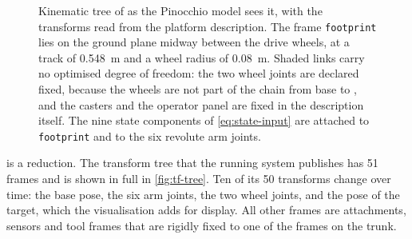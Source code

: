 \begin{figure}[htbp]
  \caption[Kinematic tree and frame convention of \hero{}]{%
    Kinematic tree of \hero{} as the Pinocchio model sees it, with the
    transforms read from the platform description. The frame
    \texttt{footprint} lies on the ground plane midway between the drive
    wheels, at a track of \qty{0.548}{\meter} and a wheel radius of
    \qty{0.08}{\meter}. Shaded links carry no optimised degree of
    freedom: the two wheel joints are declared fixed, because the wheels
    are not part of the chain from base to \ee{}, and the casters and the
    operator panel are fixed in the description itself. The nine state
    components of \cref{eq:state-input} are attached to
    \texttt{footprint} and to the six revolute arm joints.}
  \label{fig:hero-frames}
\end{figure}

 is a reduction. The transform tree that the
running system publishes has 51 frames and is shown in full in
\cref{fig:tf-tree}. Ten of its 50 transforms change over time: the base
pose, the six arm joints, the two wheel joints, and the pose of the
\ee{} target, which the \ocs{} visualisation adds for display. All
other frames are attachments, sensors and tool frames that are rigidly
fixed to one of the frames on the trunk.

